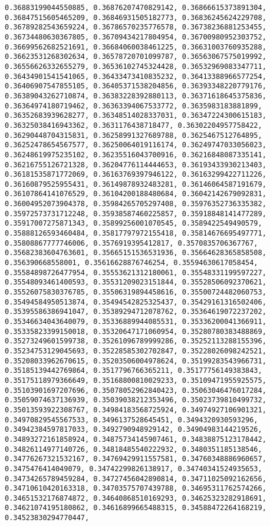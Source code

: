 \documentclass[11pt]{article}
\begin{document}
\begin{Verbatim}[commandchars=\\\{\}]
0.36883199044550885, 0.36876207470829142, 0.36866615373891304, 0.36847515605465209, 0.36846931505182773, 0.36836245624229708, 0.36789282543659224, 0.36786570235776578, 0.36738236881253455, 0.36734480630367805, 0.36709434217804954, 0.36700980952303752, 0.36699562682521691, 0.36684060038461225, 0.36631003760935288, 0.36623531268302634, 0.36578720701099787, 0.36563067575019992, 0.36556626332655279, 0.36536102745324428, 0.36532969083347711, 0.36434901541541065, 0.36433473410835232, 0.36413388966577254, 0.36406907547855105, 0.36405371538204856, 0.36393348220779176, 0.36389043262710874, 0.36383228392880113, 0.36371618645375836, 0.36364974180719462, 0.36363394067533772, 0.3635983183881899, 0.36352683939628277, 0.36348514028337031, 0.36347224300615183, 0.36325038416943362, 0.3631176438718477, 0.36302204957758422, 0.36290448704315831, 0.36258991327689788, 0.3625467512764895, 0.36252478654567577, 0.36250064019116174, 0.36249747033056023, 0.36248619975235102, 0.36235516043700916, 0.36216848087335141, 0.36216755126721328, 0.36204776114444653, 0.36193433930213403, 0.36181535871772069, 0.36163769397946122, 0.36163299422711226, 0.36160879525955431, 0.36149878932483281, 0.36146064587191679, 0.36107864141076529, 0.36104200188480684, 0.36042142679092831, 0.36004952073904378, 0.35984265705297408, 0.35976352736335382, 0.35972573731712248, 0.35938587460225857, 0.35918848141477289, 0.35917007275871343, 0.35899256001070545, 0.3589422549490579, 0.35888126593460484, 0.35817797972155418, 0.35814676695497771, 0.35808867777746006, 0.3576919395412817, 0.3570835706367767, 0.35682383604763601, 0.35665151536531936, 0.35664628365858508, 0.356390668558001, 0.35616628876746254, 0.35594630617058454, 0.35584898726477954, 0.35553621312180061, 0.35548331199597227, 0.35548093461400593, 0.35531209023151844, 0.35528506092370621, 0.35526075830376785, 0.35506319894458616, 0.35500724482060753, 0.35494584950513874, 0.35494542825325437, 0.35429161316502406, 0.35395586386941047, 0.35389294712078762, 0.35364619072237202, 0.35346634043640079, 0.35336889944085531, 0.35336200041366911, 0.35335823399150018, 0.35320647171060954, 0.35280780383488869, 0.35273249601599738, 0.35261096789999286, 0.35252113288155396, 0.35234753129045693, 0.35228585302702847, 0.35228026098242521, 0.35208033962670615, 0.35203506004978624, 0.35199283543966731, 0.35185139442769864, 0.3517796766365211, 0.35177756149383843, 0.35175118979366649, 0.35168800810029233, 0.35109471955925575, 0.35103901697207696, 0.35078052962840423, 0.35063046476017284, 0.35059074637136939, 0.35039038212353496, 0.35023739810499732, 0.35013593922308767, 0.34984183568725924, 0.34974927106901321, 0.34970829545567533, 0.3496137528645451, 0.3494320930593296, 0.34942384597817033, 0.3492790948929142, 0.34904983144219526, 0.34893272161858924, 0.34875734145907461, 0.34838875123178442, 0.34826114977140726, 0.34818485540222932, 0.3480351185138546, 0.34776267321532167, 0.34769429911557581, 0.34760348886960657, 0.3475476414049079, 0.34742299826138917, 0.34740341524935653, 0.34734265789459284, 0.34727456042890814, 0.34711025092162656, 0.34710610420163318, 0.34703575707439788, 0.34695311762574266, 0.34651532176874872, 0.34640868510169293, 0.34625323282918691, 0.34621074195180862, 0.34616899665488315, 0.34588472264168219, 0.34523830294770447, 
\end{Verbatim}
\end{document}
